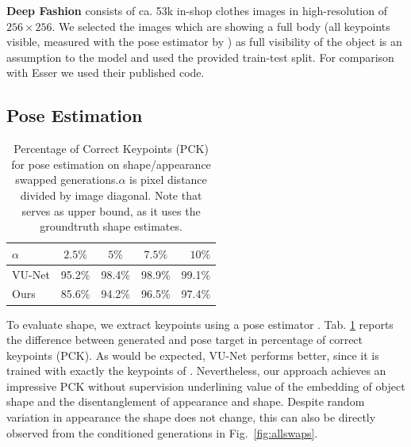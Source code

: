 		\begin{tcolorbox}
			\textbf{Deep Fashion} \cite{liu16deepfashion, liu16deepfashionwild} consists of ca. 53k in-shop clothes images in high-resolution of $256 \times 256$. We selected the images which are showing a full body (all keypoints visible, measured with the pose estimator by \cite{cao17affinityfield}) as full visibility of the object is an assumption to the model and used the provided train-test split. For comparison with Esser \etal \cite{esser18} we used their published code.
		\end{tcolorbox}

	\subsection{Pose Estimation}

		\begin{table}[htp]
			\centering
			\caption{Percentage of Correct Keypoints (PCK) for pose estimation on shape/appearance swapped generations.\;$\alpha$ is pixel distance divided by image diagonal. Note that \cite{esser18} serves as upper bound, as it uses the groundtruth shape estimates.}
			\label{tab:pose}
			\begin{tabular}{l|cccr}
				\hline
				$\alpha$ & $2.5\%$ &  $5\%$ & $7.5\%$ & $10\%$ \\ \hline
				VU-Net \cite{esser18} & {95.2}\% & {98.4}\% & {98.9}\% & {99.1}\% \\
				Ours & 85.6\% & 94.2\% &96.5\% & 97.4\% \\ \hline
			\end{tabular}
		\end{table}


		To evaluate shape, we extract keypoints using a pose estimator \cite{cao17affinityfield}. Tab. \ref{tab:pose} reports the difference between generated and pose target in percentage of correct keypoints (PCK).
		As would be expected, VU-Net performs better, since it is trained with exactly the keypoints of \cite{cao17affinityfield}. Nevertheless, our approach achieves an impressive PCK without supervision underlining value of the embedding of object shape and the disentanglement of appearance and shape. Despite random variation in appearance the shape does not change, this can also be directly observed from the conditioned generations in Fig.~\ref{fig:allswaps}.

